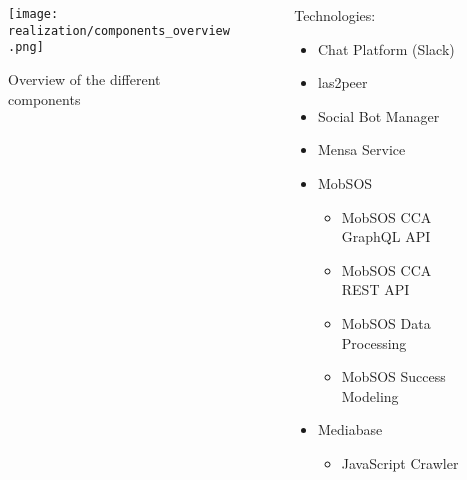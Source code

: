 \begin{frame}\begin{columns}
    \begin{column}[]{0.7\textwidth}
      \begin{figure}
        \centering
        \texttt{[image: realization/components\_overview.png]}
        \caption{Overview of the different components}
        \label{fig:componentsOverview}
      \end{figure}
    \end{column}
    \begin{column}[]{0.3\textwidth}
      Technologies:
      \begin{itemize}
        \item Chat Platform (Slack)
        \item las2peer
        \item Social Bot Manager
        \item Mensa Service
        \item MobSOS
              \begin{itemize}
                \item MobSOS CCA GraphQL API
                \item MobSOS CCA REST API
                \item MobSOS Data Processing
                \item MobSOS Success Modeling
              \end{itemize}
        \item Mediabase
              \begin{itemize}
                \item JavaScript Crawler
              \end{itemize}
      \end{itemize}
    \end{column}
  \end{columns}
\end{frame}

